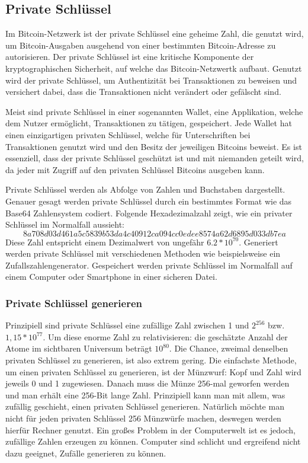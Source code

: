 \subsection{Private Schlüssel}
Im Bitcoin-Netzwerk ist der private Schlüssel eine geheime Zahl, die genutzt wird, um Bitcoin-Ausgaben ausgehend von einer 
bestimmten Bitcoin-Adresse zu autorisieren. Der private Schlüssel ist eine kritische Komponente der kryptographischen Sicherheit,
auf welche das Bitcoin-Netzwertk aufbaut. Genutzt wird der private Schlüssel, um Authentizität bei Transaktionen zu beweisen und
versichert dabei, dass die Transaktionen nicht verändert oder gefälscht sind.

Meist sind private Schlüssel in einer sogenannten Wallet, eine Applikation, welche dem Nutzer ermöglicht, Transaktionen zu tätigen,
gespeichert. Jede Wallet hat einen einzigartigen privaten Schlüssel, welche für Unterschriften bei Transaktionen genutzt wird und
den Besitz der jeweiligen Bitcoins beweist. Es ist essenziell, dass der private Schlüssel geschützt ist und mit niemanden geteilt
wird, da jeder mit Zugriff auf den privaten Schlüssel Bitcoins ausgeben kann.

Private Schlüssel werden als Abfolge von Zahlen und Buchstaben dargestellt. Genauer gesagt werden private Schlüssel durch ein
bestimmtes Format wie das Base64 Zahlensystem codiert. Folgende Hexadezimalzahl zeigt, wie ein privater Schlüssel im 
Normalfall aussieht: \[8a708d03d461a5c5839b53da4c40912ca094cc0edee8574a62d6895d033db7ea\] Diese Zahl entspricht einem Dezimalwert 
von ungefähr \( 6.2 * 10^{70} \). Generiert werden private Schlüssel mit verschiedenen Methoden wie beispielsweise ein 
Zufallszahlengenerator. Gespeichert werden private Schlüssel im Normalfall auf einem Computer oder Smartphone in einer sicheren 
Datei.

\subsubsection{Private Schlüssel generieren}
Prinzipiell sind private Schlüssel eine zufällige Zahl zwischen 1 und \( 2^{256} \) bzw. \( 1,15 * 10^{77} \). Um diese enorme Zahl
zu relativisieren: die geschätzte Anzahl der Atome im sichtbaren Universum beträgt \( 10^{80} \).  Die Chance,
zweimal denselben privaten Schlüssel zu generieren, ist also extrem gering. Die einfachste Methode, um einen privaten Schlüssel
zu generieren, ist der Münzwurf: Kopf und Zahl wird jeweils 0 und 1 zugewiesen. Danach muss die Münze 256-mal geworfen werden
und man erhält eine 256-Bit lange Zahl. Prinzipiell kann man mit allem, was zufällig geschieht, einen privaten Schlüssel generieren.
Natürlich möchte man nicht für jeden privaten Schlüssel 256 Münzwürfe machen, deswegen werden hierfür Rechner genutzt. Ein großes
Problem in der Computerwelt ist es jedoch, zufällige Zahlen erzeugen zu können. Computer sind schlicht und ergreifend nicht dazu 
geeignet, Zufälle generieren zu können.

